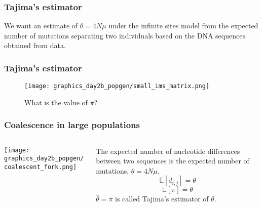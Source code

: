 \documentclass{beamer}
\newcommand{\E}{\mathbb{E}}
\newcommand{\1}{\ensuremath{\mathbf{1}}}
\begin{document}
%
%
%
\begin{frame}\frametitle{Tajima’s estimator}
	We want an estimate of $\theta = 4N\mu$ under the infinite sites model from the expected number of mutations separating two individuals based on the DNA sequences obtained from data.\\[2ex]
\end{frame}
%
%
%
\begin{frame}\frametitle{Tajima’s estimator}
	\begin{figure}
	\begin{center}
		\texttt{[image: graphics\_day2b\_popgen/small\_ims\_matrix.png]}
	\end{center}
	\caption{What is the value of $\pi$?}
	\end{figure}
\end{frame}
%
%
%
\begin{frame}\frametitle{Coalescence in large populations}
	\begin{columns}
	\begin{column}{.33\textwidth}
		\begin{center}
			\texttt{[image: graphics\_day2b\_popgen/coalescent\_fork.png]}
		\end{center}
	\end{column}
	\begin{column}{.66\textwidth}
		The expected number of nucleotide differences between two sequences is the expected number of mutations, $\theta = 4N\mu$.
		\begin{equation}
			\E[d_{i,j}] = \theta
		\end{equation}
		\begin{equation}
			\E[\pi] = \theta
		\end{equation}
		$\hat\theta = \pi$ is called Tajima’s estimator of $\theta$.
	\end{column}
	\end{columns}
\end{frame}
\end{document}
